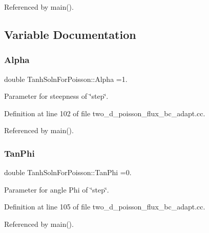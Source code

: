 Referenced by main().



\subsection{Variable Documentation}
\mbox{\label{namespaceTanhSolnForPoisson_ae676ccd186d5df119cce811596d949c1}} 
\subsubsection{\texorpdfstring{Alpha}{Alpha}}
{\footnotesize\ttfamily double Tanh\+Soln\+For\+Poisson\+::\+Alpha =1.}



Parameter for steepness of \char`\"{}step\char`\"{}. 



Definition at line 102 of file two\+\_\+d\+\_\+poisson\+\_\+flux\+\_\+bc\+\_\+adapt.\+cc.



Referenced by main().

\mbox{\label{namespaceTanhSolnForPoisson_a785ccd00a727125a5138fbbcac173294}} 
\subsubsection{\texorpdfstring{Tan\+Phi}{TanPhi}}
{\footnotesize\ttfamily double Tanh\+Soln\+For\+Poisson\+::\+Tan\+Phi =0.}



Parameter for angle Phi of \char`\"{}step\char`\"{}. 



Definition at line 105 of file two\+\_\+d\+\_\+poisson\+\_\+flux\+\_\+bc\+\_\+adapt.\+cc.



Referenced by main().

